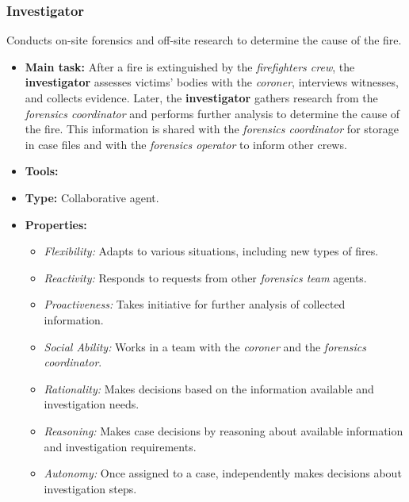 \subsubsection{Investigator}
Conducts on-site forensics and off-site research to determine the cause of the fire.
\begin{itemize}
    \item \textbf{Main task:} After a fire is extinguished by the \textit{firefighters crew}, the \textbf{investigator} assesses victims' bodies with the \textit{coroner}, interviews witnesses, and collects evidence. Later, the \textbf{investigator} gathers research from the \textit{forensics coordinator} and performs further analysis to determine the cause of the fire. This information is shared with the \textit{forensics coordinator} for storage in case files and with the \textit{forensics operator} to inform other crews.
    \item \textbf{Tools:}
    \item \textbf{Type:} Collaborative agent.
    \item \textbf{Properties:}
    \begin{itemize}
        \item \textit{Flexibility:} Adapts to various situations, including new types of fires.
        \item \textit{Reactivity:} Responds to requests from other \textit{forensics team} agents.
        \item \textit{Proactiveness:} Takes initiative for further analysis of collected information.
        \item \textit{Social Ability:} Works in a team with the \textit{coroner} and the \textit{forensics coordinator}.
        \item \textit{Rationality:} Makes decisions based on the information available and investigation needs.
        \item \textit{Reasoning:} Makes case decisions by reasoning about available information and investigation requirements.
        \item \textit{Autonomy:} Once assigned to a case, independently makes decisions about investigation steps.
    \end{itemize}
\end{itemize}


